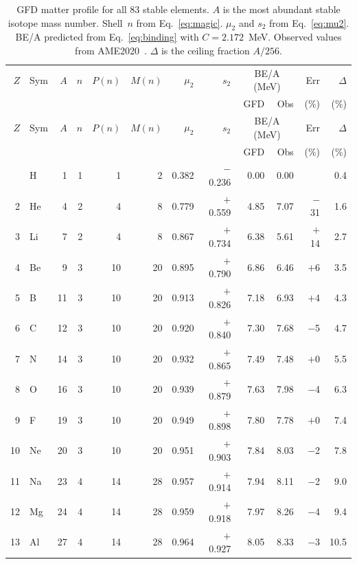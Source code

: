 \documentclass[twocolumn]{iopjournal}
\begin{document}
\begin{longtable}{r l r r r r r r r r r r}
\caption{GFD matter profile for all 83 stable elements. $A$ is the
most abundant stable isotope mass number. Shell~$n$ from
Eq.~\protect\eqref{eq:magic}. $\mu_2$ and $s_2$ from
Eq.~\protect\eqref{eq:mu2}. BE/A predicted from
Eq.~\protect\eqref{eq:binding} with $C = 2.172$~MeV. Observed
values from AME2020~\protect\cite{ame2020}.
$\Delta$ is the ceiling fraction $A/256$.}
\label{tab:full} \\
\toprule
$Z$ & Sym & $A$ & $n$ & $P(n)$ & $M(n)$ & $\mu_2$ & $s_2$ &
\multicolumn{2}{c}{BE/A (MeV)} & Err & $\Delta$ \\
& & & & & & & & GFD & Obs & (\%) & (\%) \\
\midrule
\endfirsthead
\toprule
$Z$ & Sym & $A$ & $n$ & $P(n)$ & $M(n)$ & $\mu_2$ & $s_2$ &
\multicolumn{2}{c}{BE/A (MeV)} & Err & $\Delta$ \\
& & & & & & & & GFD & Obs & (\%) & (\%) \\
\midrule
\endhead
\bottomrule
\endfoot
 1 & H  &   1 & 1 &   1 &   2 & 0.382 & $-$0.236 &  0.00 &  0.00 &     & 0.4 \\
 2 & He &   4 & 2 &   4 &   8 & 0.779 & $+$0.559 &  4.85 &  7.07 & $-$31 & 1.6 \\
 3 & Li &   7 & 2 &   4 &   8 & 0.867 & $+$0.734 &  6.38 &  5.61 & $+$14 & 2.7 \\
 4 & Be &   9 & 3 &  10 &  20 & 0.895 & $+$0.790 &  6.86 &  6.46 & $+$6  & 3.5 \\
 5 & B  &  11 & 3 &  10 &  20 & 0.913 & $+$0.826 &  7.18 &  6.93 & $+$4  & 4.3 \\
 6 & C  &  12 & 3 &  10 &  20 & 0.920 & $+$0.840 &  7.30 &  7.68 & $-$5  & 4.7 \\
 7 & N  &  14 & 3 &  10 &  20 & 0.932 & $+$0.865 &  7.49 &  7.48 & $+$0  & 5.5 \\
 8 & O  &  16 & 3 &  10 &  20 & 0.939 & $+$0.879 &  7.63 &  7.98 & $-$4  & 6.3 \\
 9 & F  &  19 & 3 &  10 &  20 & 0.949 & $+$0.898 &  7.80 &  7.78 & $+$0  & 7.4 \\
10 & Ne &  20 & 3 &  10 &  20 & 0.951 & $+$0.903 &  7.84 &  8.03 & $-$2  & 7.8 \\
11 & Na &  23 & 4 &  14 &  28 & 0.957 & $+$0.914 &  7.94 &  8.11 & $-$2  & 9.0 \\
12 & Mg &  24 & 4 &  14 &  28 & 0.959 & $+$0.918 &  7.97 &  8.26 & $-$4  & 9.4 \\
13 & Al &  27 & 4 &  14 &  28 & 0.964 & $+$0.927 &  8.05 &  8.33 & $-$3  & 10.5 \\

\end{longtable}
\end{document}
